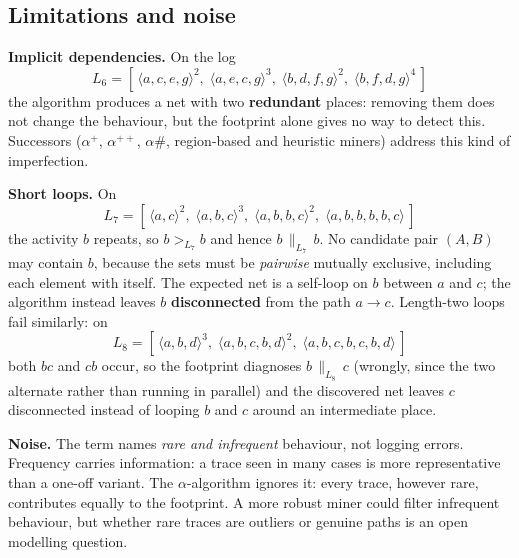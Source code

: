 \subsection{Limitations and noise}

\textbf{Implicit dependencies.} On the log
\[
  L_6 = [\,\langle a, c, e, g\rangle^2,\;\langle a, e, c, g\rangle^3,\;\langle b, d, f, g\rangle^2,\;\langle b, f, d, g\rangle^4\,]
\]
the algorithm produces a net with two \textbf{redundant} places: removing them does not change the behaviour, but the footprint alone gives no way to detect this. Successors ($\alpha^+$, $\alpha^{++}$, $\alpha\#$, region-based and heuristic miners) address this kind of imperfection.

\textbf{Short loops.} On
\[
  L_7 = [\,\langle a, c\rangle^2,\;\langle a, b, c\rangle^3,\;\langle a, b, b, c\rangle^2,\;\langle a, b, b, b, b, c\rangle\,]
\]
the activity $b$ repeats, so $b >_{L_7} b$ and hence $b \,\|_{L_7}\, b$. No candidate pair $(A, B)$ may contain $b$, because the sets must be \emph{pairwise} mutually exclusive, including each element with itself. The expected net is a self-loop on $b$ between $a$ and $c$; the algorithm instead leaves $b$ \textbf{disconnected} from the path $a \to c$. Length-two loops fail similarly: on
\[
  L_8 = [\,\langle a, b, d\rangle^3,\;\langle a, b, c, b, d\rangle^2,\;\langle a, b, c, b, c, b, d\rangle\,]
\]
both $bc$ and $cb$ occur, so the footprint diagnoses $b \,\|_{L_8}\, c$ (wrongly, since the two alternate rather than running in parallel) and the discovered net leaves $c$ disconnected instead of looping $b$ and $c$ around an intermediate place.

\textbf{Noise.} The term names \emph{rare and infrequent} behaviour, not logging errors. Frequency carries information: a trace seen in many cases is more representative than a one-off variant. The $\alpha$-algorithm ignores it: every trace, however rare, contributes equally to the footprint. A more robust miner could filter infrequent behaviour, but whether rare traces are outliers or genuine paths is an open modelling question.

